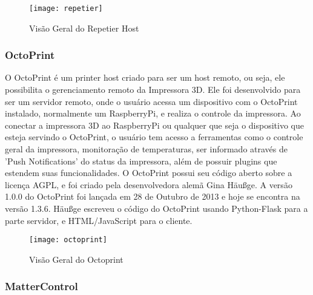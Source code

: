\begin{figure}[H]
    \centering
    \caption[Repetier Host]{Visão Geral do Repetier Host}
    \texttt{[image: repetier]}
\end{figure}

\subsubsection{OctoPrint}
O OctoPrint é um printer host criado para ser um host remoto, ou seja, ele possibilita
o gerenciamento remoto da Impressora 3D. Ele foi desenvolvido para ser um servidor remoto,
onde o usuário acessa um dispositivo com o OctoPrint instalado, normalmente um RaspberryPi,
e realiza o controle da impressora. Ao conectar a impressora 3D ao RaspberryPi ou
qualquer que seja o dispositivo que esteja servindo o OctoPrint, o usuário tem
acesso a ferramentas como o controle geral da impressora, monitoração de temperaturas,
ser informado através de 'Push Notifications' do status da impressora, além de possuir
 plugins que estendem suas funcionalidades. O OctoPrint possui seu código aberto
 sobre a licença AGPL, e foi criado pela desenvolvedora alemã Gina Häußge. A versão
 1.0.0 do OctoPrint foi lançada em 28 de Outubro de 2013 e hoje se encontra na versão 1.3.6.
Häußge escreveu o código do OctoPrint usando Python-Flask para a parte servidor, e HTML/JavaScript para o cliente.
\iffalse
Referências:
- Release: https://github.com/foosel/OctoPrint/releases
- Author: https://foosel.net/
- Licença: https://github.com/foosel/OctoPrint/blob/master/LICENSE
- Site: octoprint.org
- Features: https://octoprint.org/#full-remote-control-and-monitoring
https://octoprint.org/#compatible-and-extendable
\fi
\begin{figure}[H]
    \centering
    \caption[Octoprint]{Visão Geral do Octoprint}
    \texttt{[image: octoprint]}
\end{figure}

\subsubsection{MatterControl}
